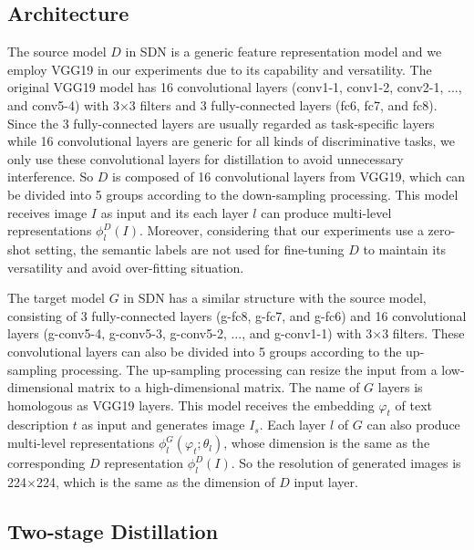 \documentclass[sigconf]{acmart}
\begin{document}
\subsection{Architecture}

The source model $D$ in SDN is a generic feature representation model and we employ VGG19 \cite{simonyan2014very} in our experiments due to its capability and versatility. The original VGG19 model has 16 convolutional layers (conv1-1, conv1-2, conv2-1, ..., and conv5-4) with 3$\times$3 filters and 3 fully-connected layers (fc6, fc7, and fc8). Since the 3 fully-connected layers are usually regarded as task-specific layers while 16 convolutional layers are generic for all kinds of discriminative tasks, we only use these convolutional layers for distillation to avoid unnecessary interference. So $D$ is composed of 16 convolutional layers from VGG19, which can be divided into 5 groups according to the down-sampling processing. This model receives image $I$ as input and its each layer $l$ can produce multi-level representations $\phi_l^D(I)$. Moreover, considering that our experiments use a zero-shot setting, the semantic labels are not used for fine-tuning $D$ to maintain its versatility and avoid over-fitting situation.

The target model $G$ in SDN has a similar structure with the source model, consisting of 3 fully-connected layers (g-fc8, g-fc7, and g-fc6) and 16 convolutional layers (g-conv5-4, g-conv5-3, g-conv5-2, ..., and g-conv1-1) with 3$\times$3 filters. These convolutional layers can also be divided into 5 groups according to the up-sampling processing. The up-sampling processing can resize the input from a low-dimensional matrix to a high-dimensional matrix. The name of $G$ layers is homologous as VGG19 layers. This model receives the embedding $\varphi_t$ of text description $t$ as input and generates image $I_s$. Each layer $l$ of $G$ can also produce multi-level representations $\phi_l^G(\varphi_t;\theta_l)$, whose dimension is the same as the corresponding $D$ representation $\phi_l^D(I)$. So the resolution of generated images is 224$\times$224, which is the same as the dimension of $D$ input layer. %

\subsection{Two-stage Distillation}
\end{document}

